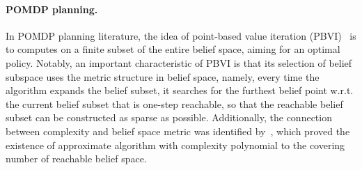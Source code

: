 \documentclass[twoside]{article}
\newcommand{\yplu}[1]{{\color{orange}{ [\textbf{Yiping:}} #1]}}
\begin{document}
\paragraph{POMDP planning.}
In POMDP planning literature, the idea of point-based value iteration (PBVI)~\cite{shani2013survey, inproceedings,inproceedings-2,4667695,article,10.5555/1622519.1622525} is to computes on a finite subset of the entire belief space, aiming for an optimal policy. Notably, an important characteristic of PBVI is that its selection of belief subspace uses the metric structure in belief space, namely, every time the algorithm expands the belief subset, it searches for the furthest belief point w.r.t. the current belief subset that is one-step reachable, so that the reachable belief subset can be constructed as sparse as possible. Additionally, the connection between complexity and belief space metric was identified by~\cite{lee2007makes,zhang2014covering}, which proved the existence of approximate algorithm with complexity polynomial to the covering number of reachable belief space. %

\end{document}
